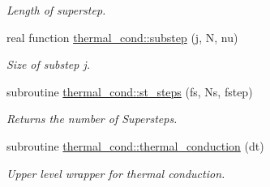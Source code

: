 \begin{DoxyCompactItemize}
\begin{DoxyCompactList}\small\item\em Length of superstep. \end{DoxyCompactList}\item 
real function \hyperlink{namespacethermal__cond_a782aaba01217281f2aa57dcc955fd294}{thermal\+\_\+cond\+::substep} (j, N, nu)
\begin{DoxyCompactList}\small\item\em Size of substep j. \end{DoxyCompactList}\item 
subroutine \hyperlink{namespacethermal__cond_a4c74dc0fd6a165d0fea419b560943701}{thermal\+\_\+cond\+::st\+\_\+steps} (fs, Ns, fstep)
\begin{DoxyCompactList}\small\item\em Returns the number of Supersteps. \end{DoxyCompactList}\item 
subroutine \hyperlink{namespacethermal__cond_a685d70692ba68e1ebc0b5d6d8ee8e646}{thermal\+\_\+cond\+::thermal\+\_\+conduction} (dt)
\begin{DoxyCompactList}\small\item\em Upper level wrapper for thermal conduction. \end{DoxyCompactList}\end{DoxyCompactItemize}
